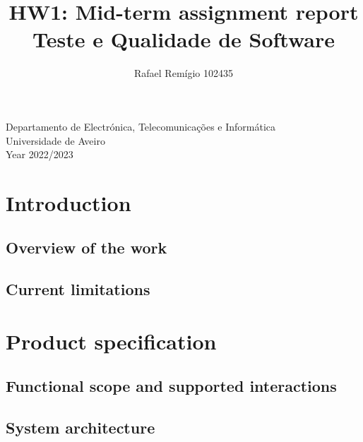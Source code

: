 \documentclass[12pt]{article}
\begin{document}
\begin{titlepage}

\title{%
  HW1: Mid-term assignment report\\
  \large  Teste e Qualidade de Software\\}

\author{Rafael Remígio 102435}

\maketitle

\vfill
\begin{center}

	Departamento de Electrónica, Telecomunicações e Informática\\
       Universidade de Aveiro\\ Year 2022/2023
\end{center}



\end{titlepage}

\tableofcontents


\section{Introduction}



\subsection{Overview of the work} 


\subsection{Current limitations} 


\section{Product specification}


\subsection{Functional scope and supported interactions }

\subsection{System architecture}
\end{document}
